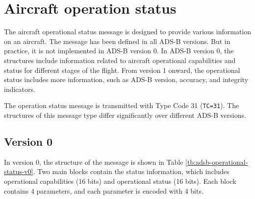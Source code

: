 \chapter{Aircraft operation status}\label{aircraft-operation-status}

The aircraft operational status message is designed to provide various information on an aircraft. The message has been defined in all ADS-B versions. But in practice, it is not implemented in ADS-B version 0. In ADS-B version 0, the structures include information related to aircraft operational capabilities and status for different stages of the flight. From version 1 onward, the operational status includes more information, such as ADS-B version, accuracy, and integrity indicators.

The operation status message is transmitted with Type Code 31 (\texttt{TC=31}). The structures of this message type differ significantly over different ADS-B versions.

\section{Version 0}

In version 0, the structure of the message is shown in Table \ref{tb:adsb-operational-status-v0}. Two main blocks contain the status information, which includes operational capabilities (16 bits) and operational status (16 bits). Each block contains 4 parameters, and each parameter is encoded with 4 bits.


